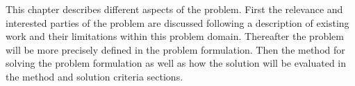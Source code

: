 This chapter describes different aspects of the problem. First the relevance and interested parties of the problem are discussed following a description of existing work and their limitations within this problem domain. Thereafter the problem will be more precisely defined in the problem formulation. Then the method for solving the problem formulation as well as how the solution will be evaluated in the method and solution criteria sections. 